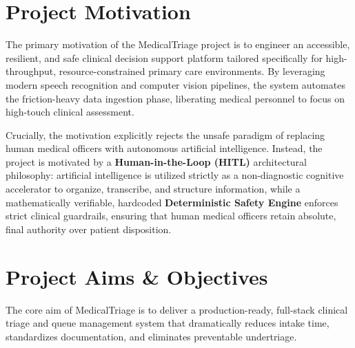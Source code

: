 \documentclass[11pt,a4paper,oneside]{report}
\begin{document}
\section{Project Motivation}
The primary motivation of the MedicalTriage project is to engineer an accessible, resilient, and safe clinical decision support platform tailored specifically for high-throughput, resource-constrained primary care environments. By leveraging modern speech recognition and computer vision pipelines, the system automates the friction-heavy data ingestion phase, liberating medical personnel to focus on high-touch clinical assessment.

Crucially, the motivation explicitly rejects the unsafe paradigm of replacing human medical officers with autonomous artificial intelligence. Instead, the project is motivated by a \textbf{Human-in-the-Loop (HITL)} architectural philosophy: artificial intelligence is utilized strictly as a non-diagnostic cognitive accelerator to organize, transcribe, and structure information, while a mathematically verifiable, hardcoded \textbf{Deterministic Safety Engine} enforces strict clinical guardrails, ensuring that human medical officers retain absolute, final authority over patient disposition.

\section{Project Aims \& Objectives}
The core aim of MedicalTriage is to deliver a production-ready, full-stack clinical triage and queue management system that dramatically reduces intake time, standardizes documentation, and eliminates preventable undertriage.
\end{document}
